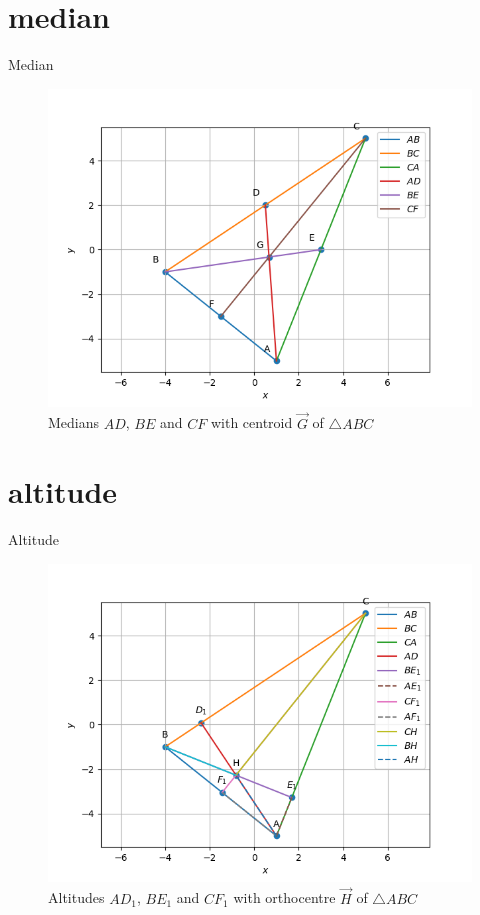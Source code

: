 \documentclass[journal,12pt,onecolumn]{IEEEtran}
\theoremstyle{remark}
\begin{document}
\begin{table}[!ht]
	\section{median}
	\centering
	
	\caption{Median}
	\label{table:median}
\end{table}

\begin{figure}
\includegraphics[width=\columnwidth]{./figs/Q1.2.2.png}
\caption{Medians $AD$, $BE$ and $CF$ with centroid $\vec{G}$ of $\triangle ABC$}
\label{fig:median}
\end{figure}

\begin{table}[!ht]
	\section{altitude}
	\centering
	
	\caption{Altitude}
	\label{table:Altitude}
\end{table}

\begin{figure}
\includegraphics[width=\columnwidth]{./figs/Q1.3.4.png}
\caption{Altitudes $AD_1$, $BE_1$ and $CF_1$ with orthocentre $\vec{H}$ of $\triangle ABC$}
\label{fig:altitude}
\end{figure}
\end{document}
